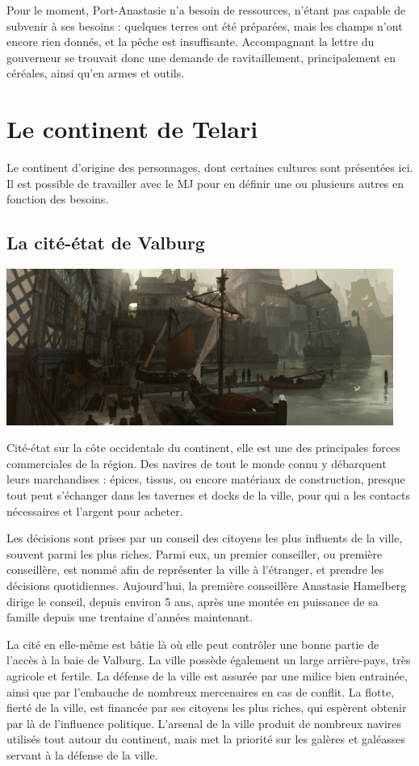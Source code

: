 \documentclass[10pt,a4paper]{book}
\newcommand{\nomcolonie}{Port-Anastasie }
\newcommand{\nomorigine}{Telari }
\begin{document}
Pour le moment, \nomcolonie n'a besoin de ressources, n'étant pas capable de subvenir à ses besoins : quelques terres ont été préparées, mais les champs n'ont encore rien donnés, et la pêche est insuffisante. Accompagnant la lettre du gouverneur se trouvait donc une demande de ravitaillement, principalement en céréales, ainsi qu'en armes et outils.
\chapter{Le continent de \nomorigine}
Le continent d'origine des personnages, dont certaines cultures sont présentées ici. Il est possible de travailler avec le MJ pour en définir une ou plusieurs autres en fonction des besoins.
\section{La cité-état de Valburg}
\newcommand{\souverain}{ la première conseillère Anastasie Hamelberg }
\includegraphics[width=0.95\textwidth]{valburg}

Cité-état sur la côte occidentale du continent, elle est une des principales forces commerciales de la région. Des navires de tout le monde connu y débarquent leurs marchandises : épices, tissus, ou encore matériaux de construction, presque tout peut s'échanger dans les tavernes et docks de la ville, pour qui a les contacts nécessaires et l'argent pour acheter.

Les décisions sont prises par un conseil des citoyens les plus influents de la ville, souvent parmi les plus riches. Parmi eux, un premier conseiller, ou première conseillère, est nommé afin de représenter la ville à l'étranger, et prendre les décisions quotidiennes. Aujourd'hui, \souverain dirige le conseil, depuis environ 5 ans, après une montée en puissance de sa famille depuis une trentaine d'années maintenant.

La cité en elle-même est bâtie là où elle peut contrôler une bonne partie de l'accès à la baie de Valburg. La ville possède également un large arrière-pays, très agricole et fertile. La défense de la ville est assurée par une milice bien entrainée, ainsi que par l'embauche de nombreux mercenaires en cas de conflit. La flotte, fierté de la ville, est financée par ses citoyens les plus riches, qui espèrent obtenir par là de l'influence politique. L'arsenal de la ville produit de nombreux navires utilisés tout autour du continent, mais met la priorité sur les galères et galéasses servant à la défense de la ville.
\end{document}
